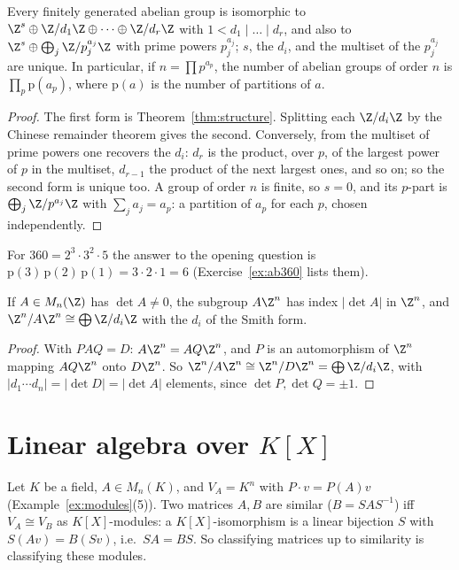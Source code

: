 \begin{corollary}\label{cor:abelian}
Every finitely generated abelian group is isomorphic to $\Z^s\oplus\Z/d_1\Z\oplus\dots\oplus\Z/d_r\Z$ with $1<d_1\mid\dots\mid d_r$, and also to $\Z^s\oplus\bigoplus_j\Z/p_j^{a_j}\Z$ with prime powers $p_j^{a_j}$; $s$, the $d_i$, and the multiset of the $p_j^{a_j}$ are unique. In particular, if $n=\prod p^{a_p}$, the number of abelian groups of order $n$ is $\prod_p\mathrm{p}(a_p)$, where $\mathrm p(a)$ is the number of partitions of $a$.
\end{corollary}
\begin{proof}
The first form is Theorem~\ref{thm:structure}. Splitting each $\Z/d_i\Z$ by the Chinese remainder theorem gives the second. Conversely, from the multiset of prime powers one recovers the $d_i$: $d_r$ is the product, over $p$, of the largest power of $p$ in the multiset, $d_{r-1}$ the product of the next largest ones, and so on; so the second form is unique too. A group of order $n$ is finite, so $s=0$, and its $p$-part is $\bigoplus_j\Z/p^{a_j}\Z$ with $\sum_ja_j=a_p$: a partition of $a_p$ for each $p$, chosen independently.
\end{proof}

For $360=2^3\cdot3^2\cdot5$ the answer to the opening question is $\mathrm p(3)\,\mathrm p(2)\,\mathrm p(1)=3\cdot2\cdot1=6$ (Exercise~\ref{ex:ab360} lists them).

\begin{corollary}\label{cor:index}
If $A\in M_n(\Z)$ has $\det A\ne0$, the subgroup $A\Z^n$ has index $|\det A|$ in $\Z^n$, and $\Z^n/A\Z^n\cong\bigoplus\Z/d_i\Z$ with the $d_i$ of the Smith form.
\end{corollary}
\begin{proof}
With $PAQ=D$: $A\Z^n=AQ\Z^n$, and $P$ is an automorphism of $\Z^n$ mapping $AQ\Z^n$ onto $D\Z^n$. So $\Z^n/A\Z^n\cong\Z^n/D\Z^n=\bigoplus\Z/d_i\Z$, with $|d_1\cdots d_n|=|\det D|=|\det A|$ elements, since $\det P,\det Q=\pm1$.
\end{proof}

\section{Linear algebra over \texorpdfstring{$K[X]$}{K[X]}}

Let $K$ be a field, $A\in M_n(K)$, and $V_A=K^n$ with $P\cdot v=P(A)v$ (Example~\ref{ex:modules}(5)). Two matrices $A,B$ are similar ($B=SAS^{-1}$) iff $V_A\cong V_B$ as $K[X]$-modules: a $K[X]$-isomorphism is a linear bijection $S$ with $S(Av)=B(Sv)$, i.e.\ $SA=BS$. So classifying matrices up to similarity is classifying these modules.

